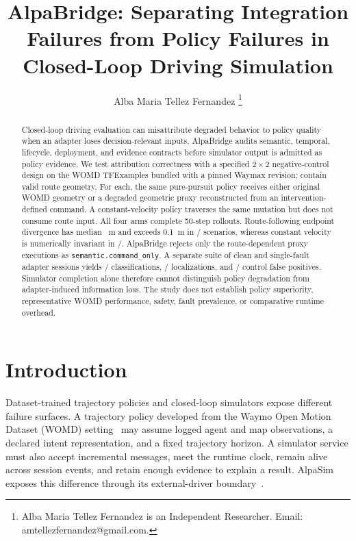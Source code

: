 \documentclass[a4paper,10pt,conference]{ieeeconf}
\title{\LARGE \bf AlpaBridge: Separating Integration Failures from Policy Failures in Closed-Loop Driving Simulation}
\author{Alba Maria Tellez Fernandez%
\thanks{Alba Maria Tellez Fernandez is an Independent Researcher.
Email: amtellezfernandez@gmail.com.}%
}
\begin{document}
\maketitle
\thispagestyle{empty}
\pagestyle{empty}

\begin{abstract}
Closed-loop driving evaluation can misattribute degraded behavior to policy quality
when an adapter loses decision-relevant inputs. AlpaBridge audits semantic, temporal,
lifecycle, deployment, and evidence contracts before simulator output is admitted as
policy evidence. We test attribution correctness with a specified $2\times2$
negative-control design on the \CVMWaymaxScenarioCount{} WOMD TFExamples bundled with a
pinned Waymax revision; \CVMWaymaxEligibleScenarios{} contain valid route geometry.
For each, the same pure-pursuit policy receives either original WOMD geometry or a
degraded geometric proxy reconstructed from an intervention-defined command. A
constant-velocity policy traverses the same mutation but does not consume route input.
All four arms complete 50-step rollouts. Route-following endpoint divergence has median
\CVMWaymaxRouteEndpointMedianM{}~m and exceeds 0.1~m in
\CVMWaymaxRouteEndpointChanged{}/\CVMWaymaxEligibleScenarios{} scenarios, whereas
constant velocity is numerically invariant in
\CVMWaymaxNegativeControlInvariant{}/\CVMWaymaxEligibleScenarios{}. AlpaBridge rejects
only the \CVMWaymaxRouteProxyRejected{} route-dependent proxy executions as
\texttt{semantic.command\_only}. A separate suite of
\CVMDiagnosticControlCases{} clean and \CVMDiagnosticFaultCases{} single-fault adapter
sessions yields \CVMWODDiagnosticCorrect{}/\CVMDiagnosticCases{} classifications,
\CVMWODDiagnosticLocalized{}/\CVMDiagnosticFaultCases{} localizations, and
\CVMWODDiagnosticFalsePositives{}/\CVMDiagnosticControlCases{} control false positives.
Simulator completion alone therefore cannot distinguish policy degradation from
adapter-induced information loss. The study does not establish policy superiority,
representative WOMD performance, safety, fault prevalence, or comparative runtime
overhead.
\end{abstract}

\section{Introduction}

Dataset-trained trajectory policies and closed-loop simulators expose different
failure surfaces. A trajectory policy developed from the Waymo Open Motion Dataset
(WOMD) setting~\cite{ettinger2021womd} may assume logged agent and map observations,
a declared intent representation, and a fixed trajectory horizon. A simulator service
must also accept
incremental messages, meet the runtime clock, remain alive across session events, and
retain enough evidence to explain a result. AlpaSim exposes this difference through
its external-driver boundary~\cite{alpasim2025}.
\end{document}
